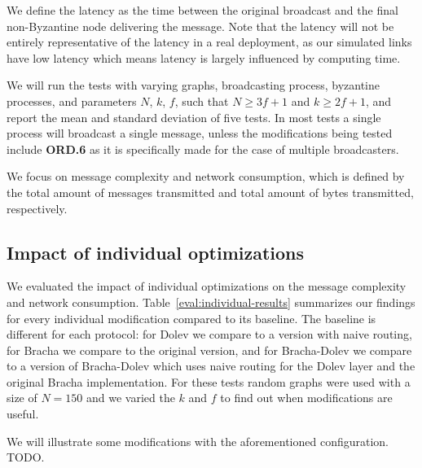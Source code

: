 We define the latency as the time between the original broadcast and the final non-Byzantine node delivering the message. Note that the latency will not be entirely representative of the latency in a real deployment, as our simulated links have low latency which means latency is largely influenced by computing time. 

We will run the tests with varying graphs, broadcasting process, byzantine processes, and parameters $N$, $k$, $f$, such that $N \ge 3f+1$ and $k \ge 2f+1$, and report the mean and standard deviation of five tests. In most tests a single process will broadcast a single message, unless the modifications being tested include \textbf{ORD.6} as it is specifically made for the case of multiple broadcasters.

We focus on message complexity and network consumption, which is defined by the total amount of messages transmitted and total amount of bytes transmitted, respectively.

\subsection{Impact of individual optimizations}
We evaluated the impact of individual optimizations on the message complexity and network consumption. Table~\ref{eval:individual-results} summarizes our findings for every individual modification compared to its baseline. The baseline is different for each protocol: for Dolev we compare to a version with naive routing, for Bracha we compare to the original version, and for Bracha-Dolev we compare to a version of Bracha-Dolev which uses naive routing for the Dolev layer and the original Bracha implementation. For these tests random graphs were used with a size of $N=150$ and we varied the $k$ and $f$ to find out when modifications are useful. 

We will illustrate some modifications with the aforementioned configuration. TODO.

